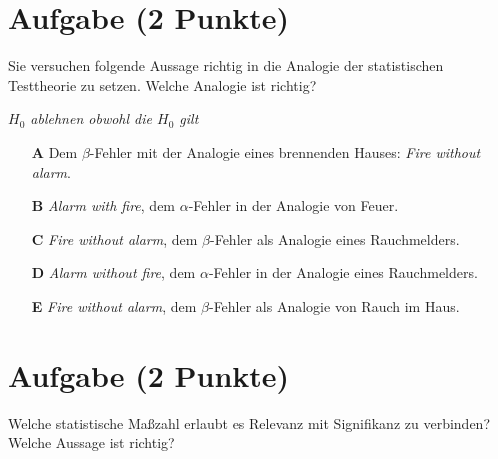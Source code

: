 \documentclass[a4paper, 9pt]{scrartcl}\usepackage[]{graphicx}\usepackage[]{xcolor}
\begin{document}

\section{Aufgabe \hfill (2 Punkte)}



Sie versuchen folgende Aussage richtig in die Analogie der statistischen Testtheorie zu setzen. Welche Analogie ist richtig?

\begin{center}
\textit{$H_0$ ablehnen obwohl die $H_0$ gilt}
\end{center}



\begin{enumerate}
\item [\textbf{A} \msquare] Dem $\beta$-Fehler mit der Analogie eines brennenden Hauses: \textit{Fire without alarm}.
\item [\textbf{B} \msquare] \textit{Alarm with fire}, dem $\alpha$-Fehler in der Analogie von Feuer.
\item [\textbf{C} \msquare] \textit{Fire without alarm}, dem $\beta$-Fehler als Analogie eines Rauchmelders.
\item [\textbf{D} \msquare] \textit{Alarm without fire}, dem $\alpha$-Fehler in der Analogie eines Rauchmelders.
\item [\textbf{E} \msquare] \textit{Fire without alarm}, dem $\beta$-Fehler als Analogie von Rauch im Haus.
\end{enumerate}

\section{Aufgabe \hfill (2 Punkte)}



Welche statistische Maßzahl erlaubt es Relevanz mit Signifikanz zu verbinden? Welche Aussage ist richtig?
\end{document}

